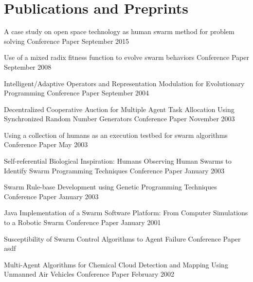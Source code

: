 \documentclass{cv_style}
\begin{document}

	\section{Publications and Preprints}
		\begin{etaremune}			
			\item \paper
				{A case study on open space technology as human swarm method for problem solving}
				{Conference Paper}
				{September 2015}

			\item \paper
				{Use of a mixed radix fitness function to evolve swarm behaviors}
				{Conference Paper}
				{September 2008}

			\item \paper
				{Intelligent/Adaptive Operators and Representation Modulation for Evolutionary Programming}
				{Conference Paper}
				{September 2004}
			
			\item \paper
				{Decentralized Cooperative Auction for Multiple Agent Task Allocation Using Synchronized Random Number Generators}
				{Conference Paper}
				{November 2003}

			\item \paper
				{Using a collection of humans as an execution testbed for swarm algorithms}
				{Conference Paper}
				{May 2003}

			\item \paper
				{Self-referential Biological Inspiration: Humans Observing Human Swarms to Identify Swarm Programming Techniques}
				{Conference Paper}
				{January 2003}

			\item \paper
				{Swarm Rule-base Development using Genetic Programming Techniques}
				{Conference Paper}
				{January 2003}

			\item \paper
				{Java Implementation of a Swarm Software Platform: From Computer Simulations to a Robotic Swarm}
				{Conference Paper}
				{January 2001}

			\item \paper
				{Susceptibility of Swarm Control Algorithms to Agent Failure}
				{Conference Paper}
				{asdf}

			\item \paper
				{Multi-Agent Algorithms for Chemical Cloud Detection and Mapping Using Unmanned Air Vehicles}
				{Conference Paper}
				{February 2002}
			
		\end{etaremune}
		
\end{document}
